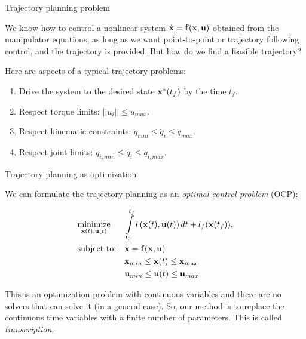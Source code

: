\documentclass{beamer}
\begin{document}
\begin{frame}{Trajectory planning problem}
	\begin{flushleft}
		
		We know how to control a nonlinear system $\dot{\mathbf{x}} = 
		\mathbf{f}(\mathbf{x}, \mathbf{u})$ obtained from the manipulator equations, as long as we want point-to-point or trajectory following control, and the trajectory is provided. But how do we find a feasible trajectory?
		
		\bigskip
		
		Here are aspects of a typical trajectory problems:
		
		\begin{enumerate}
			\item Drive the system to the desired state $\mathbf{x}^*(t_f)$ by the time $t_f$.
			
			\item Respect torque limits: $|| u_i || \leq u_{max}$.
			
			\item Respect kinematic constraints: $\dot{ q }_{min} \leq \dot{ q }_i \leq \dot{ q }_{max}$.
			
			\item Respect joint limits: $q_{i, min} \leq q_i \leq q_{i, max}$.
			
		\end{enumerate}
		
	\end{flushleft}
\end{frame}





\begin{frame}{Trajectory planning as optimization}
	\begin{flushleft}
		
		We can formulate the trajectory planning as an \emph{optimal control problem} (OCP):
		
		\begin{equation}
			\begin{aligned}
				& \underset{\mathbf{x}(t), \mathbf{u}(t)}{\text{minimize}}
				& & \int\limits_{t_0}^{t_f} l \left( \mathbf{x}(t), \mathbf{u}(t) \right) dt + l_f(\mathbf{x}(t_f)), \\
				& \text{subject to:}
				& & \dot{\mathbf{x}} = 
				\mathbf{f}(\mathbf{x}, \mathbf{u}) \\
				& & & \mathbf{x}_{min} \leq \mathbf{x}(t) \leq \mathbf{x}_{max} \\
				& & & \mathbf{u}_{min} \leq \mathbf{u}(t) \leq \mathbf{u}_{max}
			\end{aligned}
		\end{equation}
	
	This is an optimization problem with continuous variables and there are no solvers that can solve it (in a general case). So, our method is to replace the continuous time variables with a finite number of parameters. This is called \emph{transcription}.
		
	\end{flushleft}
\end{frame}
\end{document}
